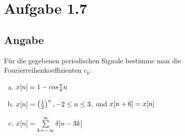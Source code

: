 \section*{Aufgabe 1.7}
\subsection*{Angabe}
Für die gegebenen periodischen Signale bestimme man die Fourierreihenkoeffizienten $c_k$:
\begin{enumerate}[a)]
	\item $x\negthinspace\left[n\right]=1-cos\frac{\pi}{4}n$
	\item $x\negthinspace\left[n\right]=\left(\frac{1}{2}\right)^n, -2\le n\le 3$, und $x\negthinspace\left[n+6\right]=x\negthinspace\left[n\right]$
	\item $x\negthinspace\left[n\right]=\sum\limits_{k=-\infty}^{\infty}\delta \negthinspace\left[n-3k\right]$
\end{enumerate}
